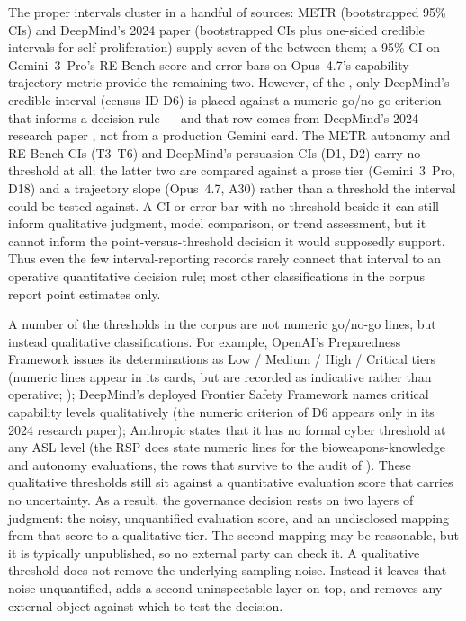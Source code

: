 \documentclass{article}
\begin{document}
The \CensusInterval{} proper intervals cluster in a handful of sources: METR (bootstrapped 95\%
CIs) and DeepMind's 2024 paper (bootstrapped CIs plus one-sided credible intervals for
self-proliferation) supply seven of the \CensusInterval{} between them; a 95\% CI on Gemini~3~Pro's RE-Bench score and error bars on Opus~4.7's capability-trajectory metric provide the remaining two. However, of the \CensusInterval{}, only DeepMind's credible interval (census ID D6) is placed against a numeric go/no-go criterion that informs a decision rule --- and that row comes from DeepMind's 2024 research paper \citep{phuong2024evaluating}, not from a production Gemini card. The METR autonomy and RE-Bench CIs (T3--T6) and DeepMind's persuasion CIs (D1, D2) carry no threshold at all; the latter two are compared against a prose tier (Gemini~3~Pro, D18) and a trajectory slope (Opus~4.7, A30) rather than a threshold the interval could be tested against. A CI or error bar with no threshold beside it can still inform qualitative judgment, model comparison, or trend assessment, but it cannot inform the point-versus-threshold decision it would supposedly support. Thus even the few interval-reporting records rarely connect that interval to an operative quantitative decision rule; most other classifications in the corpus report point estimates only.



A number of the thresholds in the corpus are not numeric go/no-go lines, but instead qualitative classifications. For example, OpenAI's Preparedness Framework issues its determinations as Low / Medium / High /
Critical tiers (numeric lines appear in its cards, but are recorded as indicative rather than operative; ); DeepMind's deployed Frontier Safety Framework names critical capability levels
qualitatively (the numeric criterion of D6 appears only in its 2024 research paper); Anthropic states that it has no formal cyber threshold
at any ASL level (the RSP does state numeric lines for the bioweapons-knowledge and autonomy evaluations, the rows that survive to the audit of ). These qualitative thresholds still sit against a quantitative evaluation score that carries
no uncertainty. As a result, the governance decision rests on two layers of judgment: the
noisy, unquantified evaluation score, and an undisclosed mapping from that score to a
qualitative tier. The second mapping may be reasonable, but it is typically unpublished, so
no external party can check it. A qualitative threshold does not remove the underlying
sampling noise. Instead it leaves that noise unquantified, adds a second uninspectable layer on
top, and removes any external object against which to test the decision.
\end{document}
